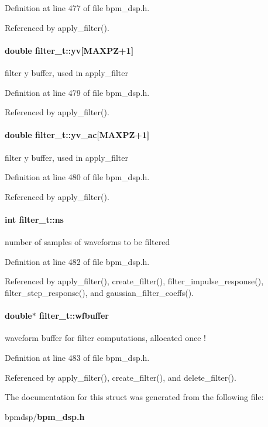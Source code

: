 Definition at line 477 of file bpm\_\-dsp.h.

Referenced by apply\_\-filter().
\paragraph[yv]{\setlength{\rightskip}{0pt plus 5cm}double {\bf filter\_\-t::yv}[MAXPZ+1]}\hfill\label{structfilter__t_7c459fa3bbf050e6a2521cd5f7542f5d}


filter y buffer, used in apply\_\-filter 

Definition at line 479 of file bpm\_\-dsp.h.

Referenced by apply\_\-filter().
\paragraph[yv\_\-ac]{\setlength{\rightskip}{0pt plus 5cm}double {\bf filter\_\-t::yv\_\-ac}[MAXPZ+1]}\hfill\label{structfilter__t_71a724a67ac888e6aaebc3962d82b3aa}


filter y buffer, used in apply\_\-filter 

Definition at line 480 of file bpm\_\-dsp.h.

Referenced by apply\_\-filter().
\paragraph[ns]{\setlength{\rightskip}{0pt plus 5cm}int {\bf filter\_\-t::ns}}\hfill\label{structfilter__t_f90dc219ac95f6b1723622a4b7946b93}


number of samples of waveforms to be filtered 

Definition at line 482 of file bpm\_\-dsp.h.

Referenced by apply\_\-filter(), create\_\-filter(), filter\_\-impulse\_\-response(), filter\_\-step\_\-response(), and gaussian\_\-filter\_\-coeffs().
\paragraph[wfbuffer]{\setlength{\rightskip}{0pt plus 5cm}double$\ast$ {\bf filter\_\-t::wfbuffer}}\hfill\label{structfilter__t_d5ac1b6a82e84bbcda0b70c56a1011a6}


waveform buffer for filter computations, allocated once ! 

Definition at line 483 of file bpm\_\-dsp.h.

Referenced by apply\_\-filter(), create\_\-filter(), and delete\_\-filter().

The documentation for this struct was generated from the following file:\begin{CompactItemize}
\item 
bpmdsp/{\bf bpm\_\-dsp.h}\end{CompactItemize}
